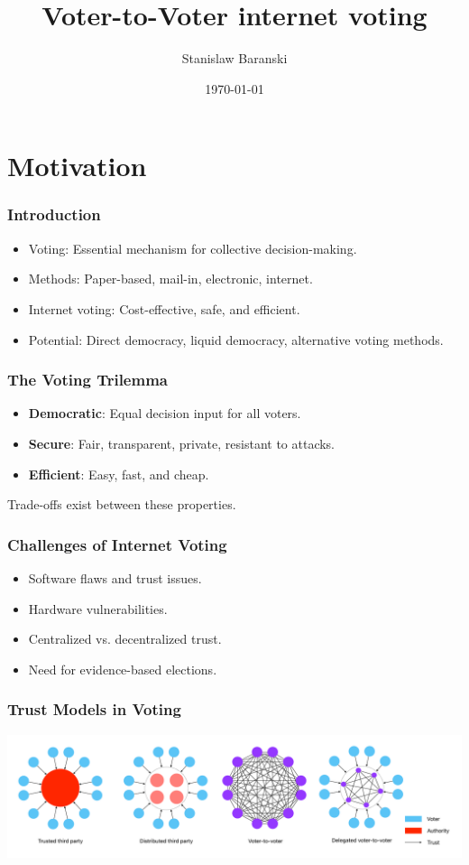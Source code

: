 \documentclass{beamer}
\title[Voter-to-Voter internet voting]{Voter-to-Voter internet voting}
\author{Stanislaw Baranski}
\date{\today}
\begin{document}
\pgtitleframe


\section{Motivation}

\begin{frame}
	\frametitle{Introduction}
	\begin{itemize}
		\item Voting: Essential mechanism for collective decision-making.
		\item Methods: Paper-based, mail-in, electronic, internet.
		\item Internet voting: Cost-effective, safe, and efficient.
		\item Potential: Direct democracy, liquid democracy, alternative voting methods.
	\end{itemize}
\end{frame}

\begin{frame}
	\frametitle{The Voting Trilemma}
	\begin{itemize}
		\item \textbf{Democratic}: Equal decision input for all voters.
		\item \textbf{Secure}: Fair, transparent, private, resistant to attacks.
		\item \textbf{Efficient}: Easy, fast, and cheap.
	\end{itemize}
	Trade-offs exist between these properties.
\end{frame}

\begin{frame}
	\frametitle{Challenges of Internet Voting}
	\begin{itemize}
		\item Software flaws and trust issues.
		\item Hardware vulnerabilities.
		\item Centralized vs. decentralized trust.
		\item Need for evidence-based elections.
	\end{itemize}
\end{frame}

\begin{frame}
	\frametitle{Trust Models in Voting}
	\includegraphics[width=\textwidth]{../paper/trust-models-voting.pdf}
\end{frame}
\end{document}
